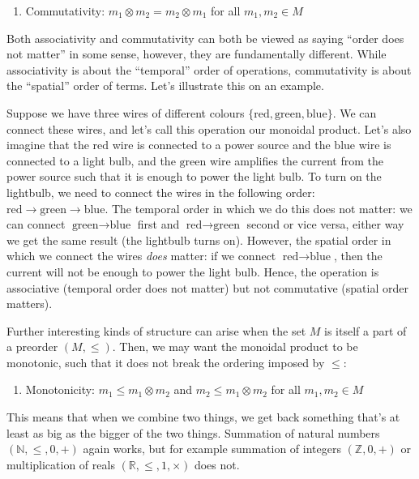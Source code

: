 \documentclass[
]{book}
\providecommand{\tightlist}{%
  \setlength{\itemsep}{0pt}\setlength{\parskip}{0pt}}
\theoremstyle{definition}
\theoremstyle{definition}
\theoremstyle{definition}
\theoremstyle{definition}
\theoremstyle{remark}
\begin{document}
\begin{enumerate}
\def\labelenumi{\arabic{enumi}.}
\setcounter{enumi}{2}
\tightlist
\item
  Commutativity: \(m_1 \otimes m_2 = m_2 \otimes m_1\) for all \(m_1, m_2 \in M\)
\end{enumerate}

Both associativity and commutativity can both be viewed as saying ``order does not matter'' in some sense, however, they are fundamentally different. While associativity is about the ``temporal'' order of operations, commutativity is about the ``spatial'' order of terms. Let's illustrate this on an example.

Suppose we have three wires of different colours \(\{ \text{red}, \text{green}, \text{blue} \}\). We can connect these wires, and let's call this operation our monoidal product. Let's also imagine that the \(\text{red}\) wire is connected to a power source and the \(\text{blue}\) wire is connected to a light bulb, and the \(\text{green}\) wire amplifies the current from the power source such that it is enough to power the light bulb. To turn on the lightbulb, we need to connect the wires in the following order: \(\text{red} \to \text{green} \to \text{blue}\). The temporal order in which we do this does not matter: we can connect \(\text{green} \to \text{blue}\) first and \(\text{red} \to \text{green}\) second or vice versa, either way we get the same result (the lightbulb turns on). However, the spatial order in which we connect the wires \emph{does} matter: if we connect \(\text{red} \to \text{blue}\), then the current will not be enough to power the light bulb. Hence, the operation is associative (temporal order does not matter) but not commutative (spatial order matters).

Further interesting kinds of structure can arise when the set \(M\) is itself a part of a preorder \((M, \leq)\). Then, we may want the monoidal product to be monotonic, such that it does not break the ordering imposed by \(\leq\):

\begin{enumerate}
\def\labelenumi{\arabic{enumi}.}
\setcounter{enumi}{3}
\tightlist
\item
  Monotonicity: \(m_1 \leq m_1 \otimes m_2\) and \(m_2 \leq m_1 \otimes m_2\) for all \(m_1, m_2 \in M\)
\end{enumerate}

This means that when we combine two things, we get back something that's at least as big as the bigger of the two things. Summation of natural numbers \((\mathbb{N}, \leq, 0, +)\) again works, but for example summation of integers \((\mathbb{Z}, 0, +)\) or multiplication of reals \((\mathbb{R}, \leq, 1, \times)\) does not.
\end{document}
